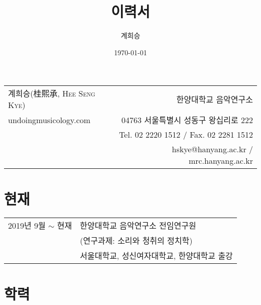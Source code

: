 \documentclass[dvipdfmx,a4paper]{article}
\title{이력서}
\author{계희승}
\date{\today}
\begin{document}
  \renewcommand{\headrulewidth}{0pt}
  \fancyhf{}
  \fancyfoot[RE,RO]{\small \thepage}
  
  \hspace*{-0.8cm}
  \begin{tabular}{p{7.6cm} r}
    {\large 계희승(桂熙承, \textsc{Hee Seng Kye})} & 한양대학교 음악연구소\\
    undoingmusicology.com & 04763 서울특별시 성동구 왕십리로 222\\
    & Tel. 02 2220 1512 / Fax. 02 2281 1512\\
    & hskye@hanyang.ac.kr / mrc.hanyang.ac.kr
  \end{tabular}
  
  \vspace{10mm}
  
  \section*{\normalsize 현재}
  
  \hspace*{-0.25cm}
  \begin{tabular}{p{4.0cm} l}
    2019년 9월 $\sim$ 현재 & 한양대학교 음악연구소 전임연구원\\
    & (연구과제: 소리와 청취의 정치학)\\
    & 서울대학교, 성신여자대학교, 한양대학교 출강
  \end{tabular}
  
  \vspace*{2.5mm}
  
  \section*{\normalsize 학력}
  
\end{document}
